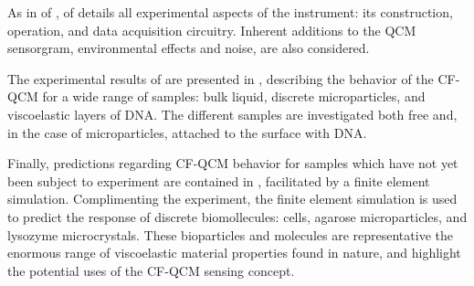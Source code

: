 As in  of ,
 of  details all experimental
aspects of the instrument: its construction, operation, and data
acquisition circuitry.  Inherent additions to the QCM sensorgram, 
environmental effects and noise, are also considered.

The experimental results of  are presented in
, describing the behavior of the CF-QCM for a
wide range of samples: bulk liquid, discrete microparticles, and
viscoelastic layers of DNA\@.  The different samples are investigated both
free and, in the case of microparticles, attached to the surface with
DNA\@.

Finally, predictions regarding CF-QCM behavior for samples which have not yet
been subject to experiment are contained in ,
facilitated by a finite element simulation.  Complimenting the experiment, the
finite element simulation is used to predict the response of discrete
biomollecules: cells, agarose microparticles, and lysozyme microcrystals.
These bioparticles and molecules are representative the enormous range of
viscoelastic material properties found in nature, and highlight the potential
uses of the CF-QCM sensing concept.
